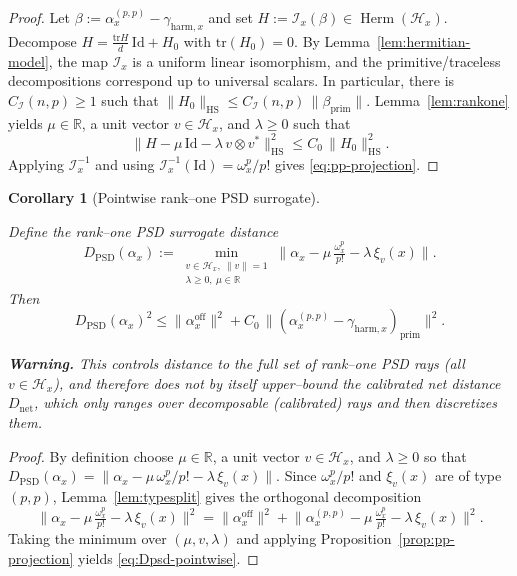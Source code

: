 \documentclass[11pt]{article}
\numberwithin{equation}{section}  %
\theoremstyle{plain}
\newtheorem{corollary}[theorem]{Corollary}
\theoremstyle{definition}
\theoremstyle{remark}
\newcommand{\Id}{\mathrm{Id}}
\newcommand{\tr}{\mathrm{tr}}
\DeclareMathOperator{\Herm}{Herm}
\newcommand{\harm}{\mathrm{harm}}
\newcommand{\prim}{\mathrm{prim}}
\begin{document}
\begin{proof}
Let $\beta:=\alpha_{x}^{(p,p)}-\gamma_{\harm,x}$ and set $H:=\mathcal I_x(\beta)\in \Herm(\mathcal H_x)$.
Decompose $H=\frac{\tr H}{d}\,\Id + H_{0}$ with $\tr(H_{0})=0$.
By Lemma~\ref{lem:hermitian-model}, the map $\mathcal I_x$ is a uniform linear isomorphism, and the primitive/traceless decompositions correspond up to universal scalars. In particular, there is $C_{\mathcal I}(n,p)\ge 1$ such that $\|H_{0}\|_{\mathrm{HS}}\le C_{\mathcal I}(n,p)\,\|\beta_{\prim}\|$.
Lemma~\ref{lem:rankone} yields $\mu\in\mathbb R$, a unit vector $v\in\mathcal H_x$, and $\lambda\ge 0$ such that
\[
\bigl\|H-\mu\,\Id-\lambda\,v\otimes v^{*}\bigr\|_{\mathrm{HS}}^{2}
\le
C_{0}\,\|H_{0}\|_{\mathrm{HS}}^{2}.
\]
Applying $\mathcal I_x^{-1}$ and using $\mathcal I_x^{-1}(\Id)=\omega_x^p/p!$ gives \eqref{eq:pp-projection}.
\end{proof}

\begin{corollary}[Pointwise rank--one PSD surrogate]\label{cor:Dpsd-pointwise}

Define the rank--one PSD surrogate distance
\[
D_{\mathrm{PSD}}(\alpha_{x})
:=
\min_{\substack{v\in \mathcal H_x,\ \|v\|=1\\ \lambda\ge 0,\ \mu\in\mathbb{R}}}
\bigl\|\alpha_{x}-\mu\,\tfrac{\omega_x^p}{p!}-\lambda\,\xi_{v}(x)\bigr\|.
\]
Then
\begin{equation}\label{eq:Dpsd-pointwise}
D_{\mathrm{PSD}}(\alpha_{x})^{2}
\le
\|\alpha_{x}^{\mathrm{off}}\|^{2}
+
C_{0}\,\|(\alpha_{x}^{(p,p)}-\gamma_{\harm,x})_{\prim}\|^{2}.
\tag{24}
\end{equation}
\smallskip

\noindent\textbf{Warning.}
This controls distance to the \emph{full} set of rank--one PSD rays (all $v\in \mathcal H_x$),
and therefore does \emph{not} by itself upper--bound the calibrated net distance $D_{\mathrm{net}}$,
which only ranges over decomposable (calibrated) rays and then discretizes them.

\end{corollary}


\begin{proof}
By definition choose $\mu\in\mathbb R$, a unit vector $v\in\mathcal H_x$, and $\lambda\ge 0$ so that
$D_{\mathrm{PSD}}(\alpha_x)=\|\alpha_x-\mu\,\omega_x^p/p!-\lambda\,\xi_v(x)\|$.
Since $\omega_x^p/p!$ and $\xi_v(x)$ are of type $(p,p)$, Lemma~\ref{lem:typesplit} gives the orthogonal decomposition
\[
\|\alpha_{x}-\mu\,\tfrac{\omega_x^p}{p!}-\lambda\,\xi_{v}(x)\|^2
=
\|\alpha_{x}^{\mathrm{off}}\|^2
+
\bigl\|\alpha_{x}^{(p,p)}-\mu\,\tfrac{\omega_x^p}{p!}-\lambda\,\xi_{v}(x)\bigr\|^2.
\]
Taking the minimum over $(\mu,v,\lambda)$ and applying Proposition~\ref{prop:pp-projection} yields \eqref{eq:Dpsd-pointwise}.
\end{proof}
\end{document}
